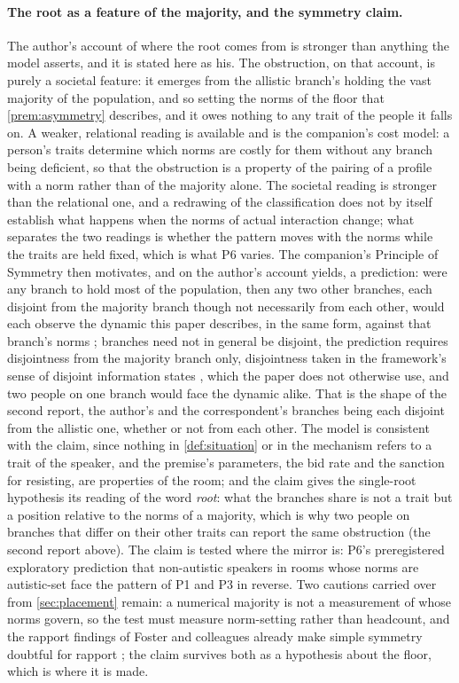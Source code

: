 \paragraph{The root as a feature of the majority, and the symmetry claim.} The author's account of where the root comes from is stronger than anything the model asserts, and it is stated here as his. The obstruction, on that account, is purely a societal feature: it emerges from the allistic branch's holding the vast majority of the population, and so setting the norms of the floor that \autoref{prem:asymmetry} describes, and it owes nothing to any trait of the people it falls on. A weaker, relational reading is available and is the companion's cost model: a person's traits determine which norms are costly for them without any branch being deficient, so that the obstruction is a property of the pairing of a profile with a norm rather than of the majority alone. The societal reading is stronger than the relational one, and a redrawing of the classification does not by itself establish what happens when the norms of actual interaction change; what separates the two readings is whether the pattern moves with the norms while the traits are held fixed, which is what P6 varies. The companion's Principle of Symmetry then motivates, and on the author's account yields, a prediction: were any branch to hold most of the population, then any two other branches, each disjoint from the majority branch though not necessarily from each other, would each observe the dynamic this paper describes, in the same form, against that branch's norms \cite{NormCost}; branches need not in general be disjoint, the prediction requires disjointness from the majority branch only, disjointness taken in the framework's sense of disjoint information states \cite{Aethus}, which the paper does not otherwise use, and two people on one branch would face the dynamic alike. That is the shape of the second report, the author's and the correspondent's branches being each disjoint from the allistic one, whether or not from each other. The model is consistent with the claim, since nothing in \autoref{def:situation} or in the mechanism refers to a trait of the speaker, and the premise's parameters, the bid rate and the sanction for resisting, are properties of the room; and the claim gives the single-root hypothesis its reading of the word \emph{root}: what the branches share is not a trait but a position relative to the norms of a majority, which is why two people on branches that differ on their other traits can report the same obstruction (the second report above). The claim is tested where the mirror is: P6's preregistered exploratory prediction that non-autistic speakers in rooms whose norms are autistic-set face the pattern of P1 and P3 in reverse. Two cautions carried over from \autoref{sec:placement} remain: a numerical majority is not a measurement of whose norms govern, so the test must measure norm-setting rather than headcount, and the rapport findings of Foster and colleagues already make simple symmetry doubtful for rapport \cite{Foster2025}; the claim survives both as a hypothesis about the floor, which is where it is made.
